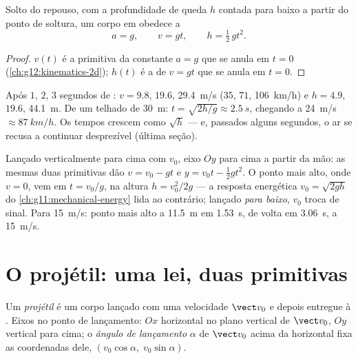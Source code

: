 \begin{proposition}\label{prop:g12:projectile-motion:vertical}
Solto do repouso, com a profundidade de queda $h$ contada para baixo a partir do ponto
de soltura, um corpo em  obedece a
\[
a = g, \qquad v = g t, \qquad h = \tfrac12\, g t^2 .
\]
\end{proposition}

\begin{proof}
$v(t)$ é a primitiva da constante $a = g$ que se anula em $t = 0$
(\cref{ch:g12:kinematics-2d}); $h(t)$ é a de $v = gt$ que se anula em $t = 0$.
\end{proof}

\begin{example}\label{ex:g12:projectile-motion:orders}
Após $1$, $2$, $3$ segundos de : $v = 9.8$, $19.6$, \qty{29.4}{m/s}
($35$, $71$, \qty{106}{km/h}) e $h = 4.9$, $19.6$, \qty{44.1}{m}. De um telhado de
\qty{30}{m}: $t = \sqrt{2h/g} \approx \qty{2.5}{s}$, chegando a \qty{24}{m/s}
$\approx \qty{87}{km/h}$. Os tempos crescem como $\sqrt h$ --- e, passados alguns
segundos, o ar se recusa a continuar desprezível (última seção).
\end{example}

\begin{example}\label{ex:g12:projectile-motion:throw}
Lançado verticalmente para cima com $v_0$, eixo $Oy$ para cima a partir da mão: as
mesmas duas primitivas dão $v = v_0 - gt$ e $y = v_0 t - \tfrac12 gt^2$. O ponto mais
alto, onde $v = 0$, vem em $t = v_0/g$, na altura $h = v_0^2/2g$ --- a resposta
energética $v_0 = \sqrt{2gh}$ do \cref{ch:g11:mechanical-energy} lida ao contrário;
lançado \emph{para baixo}, $v_0$ troca de sinal. Para \qty{15}{m/s}: ponto mais alto a
\qty{11.5}{m} em \qty{1.53}{s}, de volta em \qty{3.06}{s}, a \qty{15}{m/s}.
\end{example}

\section{O projétil: uma lei, duas primitivas}

\begin{definition}[Projétil]\label{def:g12:projectile-motion:projectile}
Um \emph{projétil} é um corpo lançado com uma velocidade $\vect v_0$ e
depois entregue à . Eixos no ponto de lançamento: $Ox$ horizontal no plano
vertical de $\vect v_0$, $Oy$ vertical para cima; o \emph{ângulo de
lançamento} $\alpha$ de $\vect v_0$ acima da horizontal
fixa as coordenadas dele, $(v_0\cos\alpha,\; v_0\sin\alpha)$.
\end{definition}


